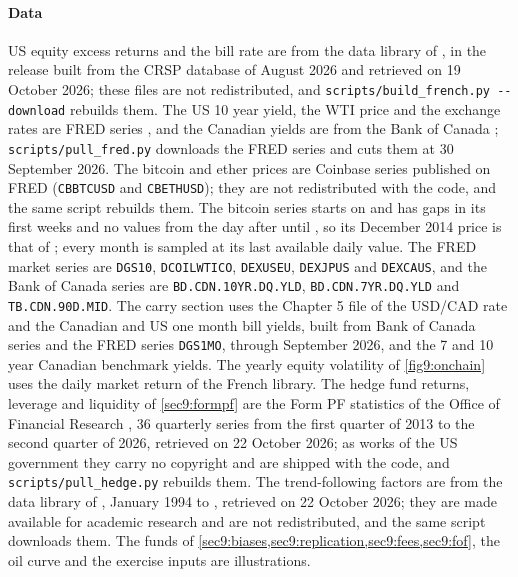\begin{chapterrefs}
\paragraph{Data}
US equity excess returns and the bill rate are from the data library of \textcite{frenchlib}, in the
release built from the CRSP database of August 2026 and retrieved on 19 October 2026; these files are
not redistributed, and \texttt{scripts/build\_french.py -{}-download} rebuilds them. The US 10 year
yield, the WTI price and the exchange rates are FRED series \parencite{fredch9}, and the Canadian yields
are from the Bank of Canada \parencite{bocvalet}; \texttt{scripts/pull\_fred.py} downloads the FRED
series and cuts them at 30 September 2026. The bitcoin and ether prices are Coinbase series published on
FRED \parencite{coinbasefred} (\texttt{CBBTCUSD} and \texttt{CBETHUSD}); they are not redistributed with
the code, and the same script rebuilds them. The bitcoin series starts on \btSeriesStart{} and has gaps in its first weeks and no values from the day after \btStartDay{} until \btNextDay, so
its December 2014 price is that of \btStartDay; every month is sampled at its last
available daily value. The FRED market series are \texttt{DGS10}, \texttt{DCOILWTICO}, \texttt{DEXUSEU},
\texttt{DEXJPUS} and \texttt{DEXCAUS}, and the Bank of Canada series are \texttt{BD.CDN.10YR.DQ.YLD},
\texttt{BD.CDN.7YR.DQ.YLD} and \texttt{TB.CDN.90D.MID}. The carry section uses the Chapter 5 file of the USD/CAD rate and the Canadian and US one month
bill yields, built from Bank of Canada series and the FRED series \texttt{DGS1MO}, through September 2026,
and the 7 and 10 year Canadian benchmark yields. The yearly equity volatility of \cref{fig9:onchain} uses
the daily market return of the French library. The hedge fund returns, leverage and liquidity of \cref{sec9:formpf}
are the Form PF statistics of the Office of Financial Research \parencite{ofrhfm}, 36 quarterly series
from the first quarter of 2013 to the second quarter of 2026, retrieved on 22 October 2026; as works of
the US government they carry no copyright and are shipped with the code, and
\texttt{scripts/pull\_hedge.py} rebuilds them. The trend-following factors are from the data library
of \textcite{hsiehdata}, January 1994 to \hdPtfsLast, retrieved on 22 October 2026; they are made
available for academic research and are not redistributed, and the same script downloads them. The funds of
\cref{sec9:biases,sec9:replication,sec9:fees,sec9:fof}, the oil curve and the exercise inputs are
illustrations.

\end{chapterrefs}
